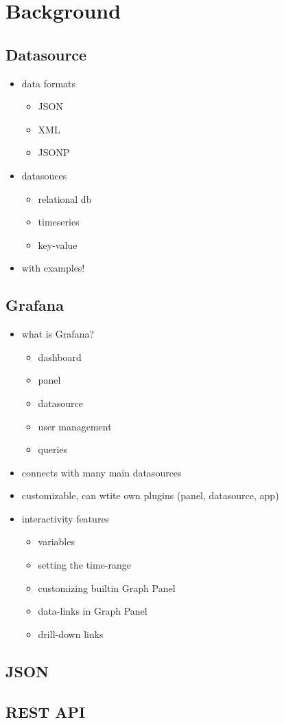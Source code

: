 \chapter{Background}

\section{Datasource}

\begin{itemize}
	\item data formats
	\begin{itemize}
		\item JSON
		\item XML
		\item JSONP
	\end{itemize}
	\item datasouces
	\begin{itemize}
		\item relational db
		\item timeseries
		\item key-value
	\end{itemize}
	\item with examples!
\end{itemize}


\section{Grafana}

\begin{itemize}
	\item what is Grafana?
	\begin{itemize}
		\item dashboard
		\item panel
		\item datasource
		\item user management
		\item queries
	\end{itemize}
	\item connects with many main datasources
	\item customizable, can wtite own plugins (panel, datasource, app)
	\item interactivity features
	\begin{itemize}
		\item variables
		\item setting the time-range
		\item customizing builtin Graph Panel
		\item data-links in Graph Panel
		\item drill-down links
	\end{itemize}
\end{itemize}

\section{JSON}

\section{REST API}
